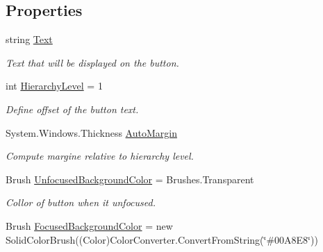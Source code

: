 \subsection*{Properties}
\begin{DoxyCompactItemize}
\item 
string \mbox{\hyperlink{class_teacher_handbook_1_1_controls_1_1_catalog_button_a6fb48124ad7934da63e34751399e46cf}{Text}}
\begin{DoxyCompactList}\small\item\em Text that will be displayed on the button. \end{DoxyCompactList}\item 
int \mbox{\hyperlink{class_teacher_handbook_1_1_controls_1_1_catalog_button_a9dbed6d9494449cc23129322ff646556}{Hierarchy\+Level}} = 1
\begin{DoxyCompactList}\small\item\em Define offset of the button text. \end{DoxyCompactList}\item 
System.\+Windows.\+Thickness \mbox{\hyperlink{class_teacher_handbook_1_1_controls_1_1_catalog_button_a4b27c513e1e4c2d0f3e0dab6bfeb2715}{Auto\+Margin}}
\begin{DoxyCompactList}\small\item\em Compute margine relative to hierarchy level. \end{DoxyCompactList}\item 
Brush \mbox{\hyperlink{class_teacher_handbook_1_1_controls_1_1_catalog_button_ae7b4076398961a53d064acc431f071b3}{Unfocused\+Background\+Color}} = Brushes.\+Transparent
\begin{DoxyCompactList}\small\item\em Collor of button when it unfocused. \end{DoxyCompactList}\item 
Brush \mbox{\hyperlink{class_teacher_handbook_1_1_controls_1_1_catalog_button_a5c4261e5d872e61b281085dc29971203}{Focused\+Background\+Color}} = new Solid\+Color\+Brush((Color)Color\+Converter.\+Convert\+From\+String(\char`\"{}\#00\+A8\+E8\char`\"{}))

\end{DoxyCompactItemize}
